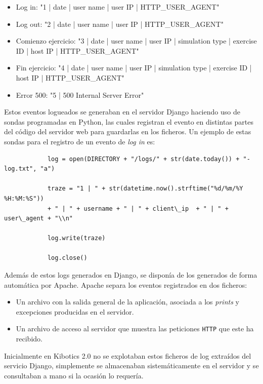 \documentclass[a4paper, 12pt]{book}
\begin{document}
		\begin{itemize}
			\item Log in: "1 | date | user name | user IP | HTTP\_USER\_AGENT"
			\item Log out: "2 | date | user name | user IP | HTTP\_USER\_AGENT"
			\item Comienzo ejercicio: "3 | date | user name | user IP | simulation type | exercise ID | host IP | HTTP\_USER\_AGENT"
			\item Fin ejercicio: "4 | date | user name | user IP | simulation type | exercise ID | host IP | HTTP\_USER\_AGENT"
			\item Error 500: "5 | 500 Internal Server Error"
		\end{itemize}
		
		Estos eventos logueados se generaban en el servidor Django haciendo uso de sondas programadas en Python, las cuales registran el evento en distintas partes del código del servidor web para guardarlas en los ficheros. Un ejemplo de estas sondas para el registro de un evento de \textit{log in} es:
		{\footnotesize
		\begin{verbatim}
			log = open(DIRECTORY + "/logs/" + str(date.today()) + "-log.txt", "a")
			
			traze = "1 | " + str(datetime.now().strftime("%d/%m/%Y %H:%M:%S")) 
			+ " | " + username + " | " + client\_ip  + " | " + user\_agent + "\\n"
			
			log.write(traze)
			
			log.close()	
		\end{verbatim}
		}
	
		Además de estos logs generados en Django, se disponía de los generados de forma automática por Apache. Apache separa los eventos registrados en dos ficheros:  
		\begin{itemize}
			\item Un archivo con la salida general de la aplicación, asociada a los \textit{prints} y excepciones producidas en el servidor.
			\item Un archivo de acceso al servidor que muestra las peticiones \texttt{HTTP} que este ha recibido.
		\end{itemize}
		
		Inicialmente en Kibotics 2.0 no se explotaban estos ficheros de log extraídos del servicio Django, simplemente se almacenaban sistemáticamente en el servidor y se consultaban a mano si la ocasión lo requería.
		
		
		
\end{document}
